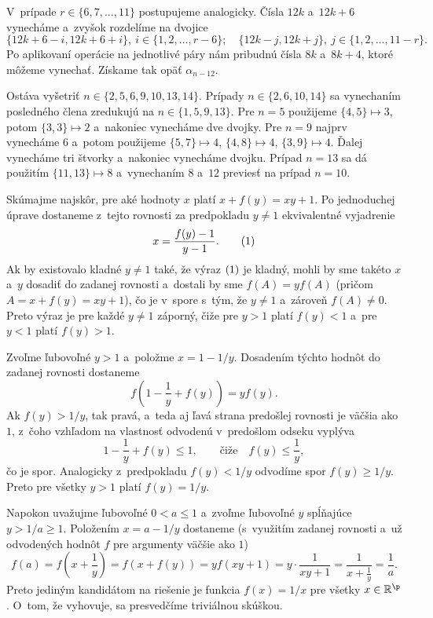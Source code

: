 {V~prípade $r\in\{6,7,\dots,11\}$ postupujeme analogicky. Čísla $12k$ a~$12k+6$ vynecháme a~zvyšok rozdelíme na dvojice
$$
\{12k+6-i, 12k+6+i\},\ i\in\{1,2,\dots,r-6\};\quad \{12k-j, 12k+j\}, \ j\in\{1,2,\dots,11-r\}.
$$
Po aplikovaní operácie na jednotlivé páry nám pribudnú čísla $8k$ a~$8k+4$, ktoré môžeme vynechať. Získame tak opäť $\alpha_{n-12}$.

Ostáva vyšetriť $n\in\{2,5,6,9,10,13,14\}$. Prípady $n\in\{2,6,10,14\}$ sa vynechaním posledného člena zredukujú na $n\in\{1,5,9,13\}$.
Pre $n=5$ použijeme $\{4,5\}\mapsto 3$, potom $\{3,3\}\mapsto 2$ a~nakoniec vynecháme dve dvojky. Pre $n=9$ najprv vynecháme $6$ a~potom použijeme
$\{5,7\}\mapsto 4$, $\{4,8\}\mapsto 4$, $\{3,9\}\mapsto 4$. Ďalej vynecháme tri štvorky a~nakoniec vynecháme dvojku. Prípad $n=13$ sa dá použitím
$\{11,13\}\mapsto 8$ a~vynechaním $8$ a~$12$ previesť na prípad $n=10$.
}

{%
Skúmajme najskôr, pre aké hodnoty $x$ platí $x+f(y)=xy+1$. Po jednoduchej úprave dostaneme z~tejto rovnosti za predpokladu $y\ne1$ ekvivalentné vyjadrenie
$$
x=\frac{f(y)-1}{y-1}.
\tag1
$$
Ak by existovalo kladné $y\ne1$ také, že výraz $\thetag1$ je kladný, mohli by sme takéto $x$ a~$y$ dosadiť do zadanej rovnosti a~dostali by sme
$f(A)=yf(A)$ (pričom $A=x+f(y)=xy+1$), čo je v~spore s~tým, že $y\ne1$ a~zároveň $f(A)\ne0$. Preto výraz  je pre každé $y\ne1$ záporný, čiže pre $y>1$ platí $f(y)<1$ a~pre $y<1$ platí $f(y)>1$.

Zvoľme ľubovoľné $y>1$ a~položme $x=1-1/y$. Dosadením týchto hodnôt do zadanej rovnosti dostaneme
$$
f\left(1-\frac1y+f(y)\right)=yf(y).
$$
Ak $f(y)>1/y$, tak pravá, a~teda aj ľavá strana predošlej rovnosti je väčšia ako $1$, z~čoho vzhľadom na vlastnosť odvodenú v~predošlom odseku vyplýva
$$
1-\frac1y+f(y)\le1,\qquad \text{čiže}\quad f(y)\le\frac1y,
$$
čo je spor. Analogicky z~predpokladu $f(y)<1/y$ odvodíme spor $f(y)\ge1/y$. Preto pre všetky $y>1$ platí $f(y)=1/y$.

Napokon uvažujme ľubovoľné $0<a\le1$ a~zvoľme ľubovoľné $y$ spĺňajúce $y>1/a\ge1$. Položením $x=a-1/y$ dostaneme (s~využitím zadanej rovnosti a~už odvodených hodnôt $f$ pre argumenty väčšie ako $1$)
$$
f(a)=f\left(x+\frac1y\right)=f(x+f(y))=yf(xy+1)=y\cdot\frac1{xy+1}=\frac1{x+\frac1y}=\frac1a.
$$
Preto jediným kandidátom na riešenie je funkcia $f(x)=1/x$ pre všetky $x\in\Bbb R^\p$. O~tom, že vyhovuje, sa presvedčíme triviálnou skúškou.
}

